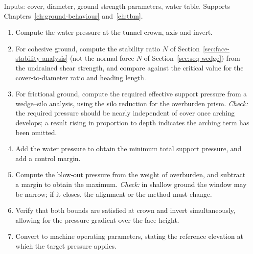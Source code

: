 Inputs: cover, diameter, ground strength parameters, water table. Supports
Chapters~\ref{ch:ground-behaviour} and~\ref{ch:tbm}.

\begin{enumerate}
  \item Compute the water pressure at the tunnel crown, axis and invert.
  \item For cohesive ground, compute the stability ratio $N$ of
  Section~\ref{sec:face-stability-analysis} (not the normal force $N$ of
  Section~\ref{sec:seq-wedge}) from the undrained shear strength, and compare
  against the critical value for the cover-to-diameter ratio and heading
  length.
  \item For frictional ground, compute the required effective support pressure
  from a wedge--silo analysis, using the silo reduction for the overburden
  prism.
  \emph{Check:} the required pressure should be nearly independent of cover
  once arching develops; a result rising in proportion to depth indicates the
  arching term has been omitted.
  \item Add the water pressure to obtain the minimum total support pressure,
  and add a control margin.
  \item Compute the blow-out pressure from the weight of overburden, and
  subtract a margin to obtain the maximum.
  \emph{Check:} in shallow ground the window may be narrow; if it closes,
  the alignment or the method must change.
  \item Verify that both bounds are satisfied at crown and invert
  simultaneously, allowing for the pressure gradient over the face height.
  \item Convert to machine operating parameters, stating the reference
  elevation at which the target pressure applies.
\end{enumerate}

\chapterreferences
